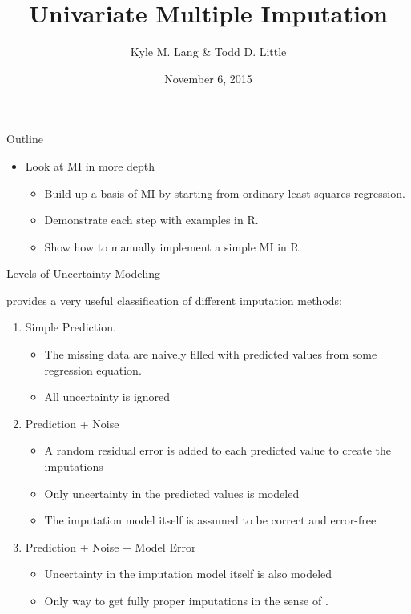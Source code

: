\documentclass[table]{beamer}
\title{Univariate Multiple Imputation}
\author{Kyle M. Lang \& Todd D. Little}
\institute[TTU IMMAP]{
  Institute for Measurement, Methodology, Analysis \& Policy\\
  Texas Tech University\\
  Lubbock, TX
}
\date{November 6, 2015}
\begin{document}
  



\begin{frame}[plain]
  
  \titlepage
  
\end{frame}


\begin{frame}{Outline}
  
  \begin{itemize}
  \item Look at MI in more depth
    \vspace{12pt}
    \begin{itemize}
    \item Build up a basis of MI by starting from ordinary least
      squares regression.
    \item Demonstrate each step with examples in \textsf{R}.
    \item Show how to manually implement a simple MI in \textsf{R}.
    \end{itemize}
  \end{itemize}
  
\end{frame}


\begin{frame}[shrink = 5]{Levels of Uncertainty Modeling}

  \citet{vanBuuren:2012} provides a very useful classification of different imputation methods:
  \vspace{12pt}
  \begin{enumerate}
  \item Simple Prediction.
    \begin{itemize}
    \item The missing data are naively filled with predicted values from some regression equation.
    \item All uncertainty is ignored
    \end{itemize}
    \vspace{12pt}
  \item Prediction + Noise
    \begin{itemize}
    \item A random residual error is added to each predicted value to create the imputations
    \item Only uncertainty in the predicted values is modeled
    \item The imputation model itself is assumed to be correct and error-free
    \end{itemize}
    \vspace{12pt}
  \item Prediction + Noise + Model Error
    \begin{itemize}
    \item Uncertainty in the imputation model itself is also modeled
    \item Only way to get fully proper imputations in the sense of \citet{rubin:1987}.
    \end{itemize}
  \end{enumerate}
  
\end{frame}
\end{document}
